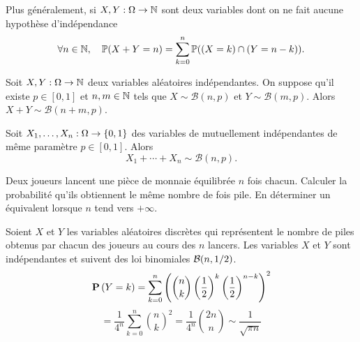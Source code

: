\documentclass{magnolia}
\begin{document}
\begin{remarqueUnique}
\remarque Plus généralement, si $X,Y:\Omega\to\mathbb{N}$ sont deux variables dont on
  ne fait aucune hypothèse d'indépendance
  \[\forall n\in\mathbb{N},\quad \mathbb{P}(X+Y=n)=\sum_{k=0}^n  \mathbb{P}((X=k)\cap(Y=n-k)).\] 
\end{remarqueUnique}

\begin{proposition}
Soit $X,Y:\Omega\to\mathbb{N}$ deux variables aléatoires indépendantes. On suppose qu'il existe
$p\in[0,1]$ et $n,m\in\mathbb{N}$ tels que $X\sim\mathcal{B}(n,p)$ et $Y\sim\mathcal{B}(m,p)$. Alors
$X+Y\sim\mathcal{B}(n+m,p)$.
\end{proposition}

\begin{proposition}
Soit $X_1,\ldots,X_n:\Omega\to\left\{0,1\right\}$ des variables de  mutuellement indépendantes de
même paramètre $p\in[0,1]$.  Alors
\[X_1+\cdots+X_n \sim \mathcal{B}(n,p).\]
\end{proposition}

\begin{exoUnique}
\exo Deux joueurs lancent une pièce de monnaie équilibrée $n$ fois chacun. Calculer la
  probabilité qu'ils obtiennent le même nombre de fois pile. En déterminer un équivalent
  lorsque $n$ tend vers $+\infty$.
\begin{sol}
Soient $X$ et $Y$ les variables aléatoires discrètes qui représentent le nombre de piles obtenus par chacun des joueurs au cours des $n$ lancers. Les variables $X$ et $Y$ sont indépendantes et suivent des loi binomiales ${\cal B}(n, 1/2)$.
\[\pr{Y=k} = \sum\limits_{k=0}^n \left( \binom{n}{k} \left( \frac 12 \right)^k
  \left( \frac 12 \right)^{n-k} \right)^2\]
\[= \frac 1{4^n} \sum\limits_{k=0}^n \binom{n}{k} ^2 = \frac 1{4^n} \binom{2n}{n}
\sim \frac{1}{\sqrt{\pi n}}\]
\end{sol}
\end{exoUnique}

\end{document}
